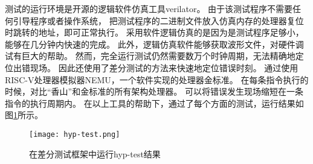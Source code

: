 测试的运行环境是开源的逻辑软件仿真工具verilator。
由于该测试程序不需要任何引导程序或者操作系统，
把测试程序的二进制文件放入仿真内存的处理器复位时跳转的地址，即可正常执行。
采用软件逻辑仿真的是因为是测试程序足够小，能够在几分钟内快速的完成。
此外，逻辑仿真软件能够获取波形文件，对硬件调试有巨大的帮助。
然而，完全运行测试仍然需要数万个时钟周期，无法精确地定位出错现场。
因此还使用了差分测试\cite{micro2022xiangshan}的方法来快速地定位错误时刻。
通过使用RISC-V处理器模拟器NEMU，一个软件实现的处理器金标准。
在每条指令执行的时候，对比“香山”和金标准的所有架构处理器。
可以将错误发生现场缩短在一条指令的执行周期内。
在以上工具的帮助下，通过了每个方面的测试，运行结果如图\ref{fig:hyp-test}所示。

\begin{figure}[htbp]
    \centering
    \texttt{[image: hyp-test.png]}
    \caption{在差分测试框架中运行hyp-test结果}
    \label{fig:hyp-test}
\end{figure}